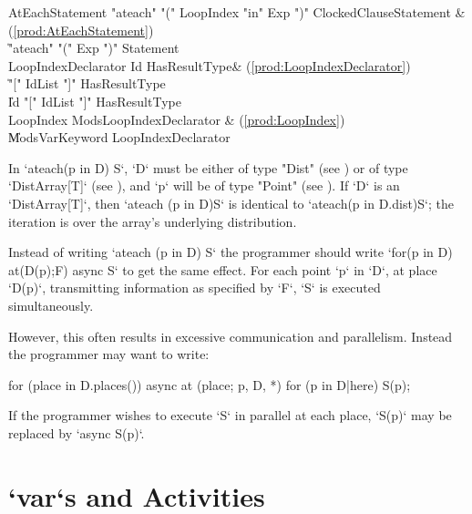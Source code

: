 \begin{bbgrammar}
     AtEachStatement \: \xcd"ateach" \xcd"(" LoopIndex \xcd"in" Exp \xcd")" ClockedClause\opt Statement & (\ref{prod:AtEachStatement}) \\
                    \| \xcd"ateach" \xcd"(" Exp \xcd")" Statement \\
 LoopIndexDeclarator \: Id HasResultType\opt & (\ref{prod:LoopIndexDeclarator}) \\
                    \| \xcd"[" IdList \xcd"]" HasResultType\opt \\
                    \| Id \xcd"[" IdList \xcd"]" HasResultType\opt \\
           LoopIndex \: Mods\opt LoopIndexDeclarator & (\ref{prod:LoopIndex}) \\
                    \| Mods\opt VarKeyword LoopIndexDeclarator \\
\end{bbgrammar}
In \xcd`ateach(p in D) S`, \xcd`D` must be either of type \xcd"Dist"
(see ) or of type \xcd`DistArray[T]` (see
), and \xcd`p` will be of type \xcd"Point" (see
). If \xcd`D` is an \xcd`DistArray[T]`, then
\xcd`ateach (p in D)S` is identical to 
\xcd`ateach(p in D.dist)S`; the iteration is over the array's underlying
distribution.   

Instead of writing \xcd`ateach (p in D) S` the programmer should write 
\xcd`for(p in D) at(D(p);F) async S` to get the same effect. 
For each point \xcd`p` in \xcd`D`, at place \xcd`D(p)`, transmitting
information as specified by \xcd`F`, 
\xcd`S` is
executed simultaneously.

However, this often results in excessive communication and parallelism. Instead the
programmer may want to write: 
\begin{xten}
for (place in D.places()) async at (place; p, D, *) {
    for (p in D|here) {
        S(p);
    }
}
\end{xten}

If the programmer wishes to execute \xcd`S` in parallel at each place,
\xcd`S(p)` may be replaced by 
\xcd`async S(p)`.

\section{\xcd`var`s and Activities}

